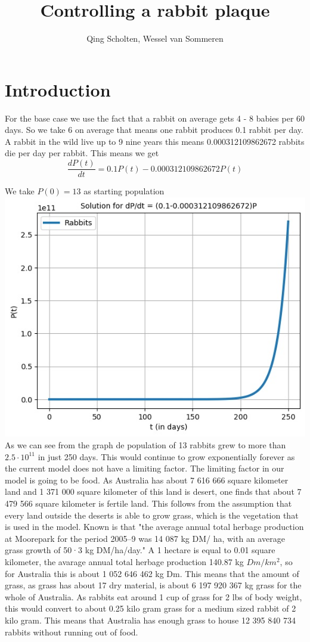 \documentclass{article}
\author{Qing Scholten, Wessel van Sommeren}
\title{Controlling a rabbit plaque}
\begin{document}
\maketitle
\newpage
\tableofcontents
\newpage

\section{Introduction}
For the base case we use the fact that a rabbit on average gets 4 - 8 babies per 60 days. So we take 6 on average that means one rabbit produces 0.1 rabbit per day. A rabbit in the wild live up to 9 nine years this means 0.000312109862672 rabbits die per day per rabbit. This means we get 
$$
\frac{dP(t)}{dt} = 0.1P(t)-0.000312109862672P(t)
$$

We take $P(0) = 13$ as starting population
\\

\includegraphics{Pictures/unr_rabbitts}
\\ 
As we can see from the graph de population of 13 rabbits grew to more than  $2.5\cdot10^{11}$ in just 250 days. This would continue to grow exponentially forever as the current model does not have a limiting factor. The limiting factor in our model is going to be food. As Australia has about 7 616 666 square kilometer land and 1 371 000 square kilometer of this land is desert, one finds that about 7 479 566 square kilometer is fertile land. This follows from the assumption that every land outside the deserts is able to grow grass, which is the vegetation that is used in the model. Known is that "the average annual total herbage production at Moorepark for the period 2005–9 was 14 087 kg DM/ ha, with an average grass growth of 50·3 kg DM/ha/day." A 1 hectare is equal to 0.01 square kilometer, the avarage annual total herbage production 140.87 kg $Dm/km^2$, so for Australia this is about 1 052 646 462 kg Dm. This means that the amount of grass, as grass has about 17 dry material, is about 6 197 920 367 kg grass for the whole of Australia. As rabbits eat around 1 cup of grass for 2 lbs of body weight, this would convert to about 0.25 kilo gram grass for a medium sized rabbit of 2 kilo gram. This means that Australia has enough grass to house 12 395 840 734 rabbits without running out of food.
\end{document}
